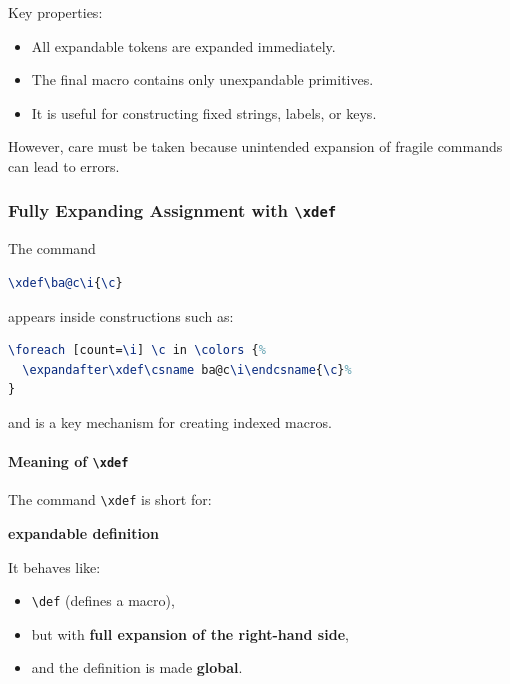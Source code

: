 Key properties:

\begin{itemize}
\item All expandable tokens are expanded immediately.
\item The final macro contains only unexpandable primitives.
\item It is useful for constructing fixed strings, labels, or keys.
\end{itemize}

However, care must be taken because unintended expansion of fragile commands can lead to errors.

\subsubsection{Fully Expanding Assignment with \texttt{\textbackslash xdef}}

The command

\begin{lstlisting}[language=LaTeX]
\xdef\ba@c\i{\c}
\end{lstlisting}

appears inside constructions such as:

\begin{lstlisting}[language=LaTeX]
\foreach [count=\i] \c in \colors {%
  \expandafter\xdef\csname ba@c\i\endcsname{\c}%
}
\end{lstlisting}

and is a key mechanism for creating indexed macros.



\paragraph{Meaning of \texttt{\textbackslash xdef}}

The command \verb|\xdef| is short for:

\begin{center}
\textbf{e\textbf{x}pandable \textbf{def}inition}
\end{center}

It behaves like:

\begin{itemize}
\item \verb|\def| (defines a macro),
\item but with \textbf{full expansion of the right-hand side},
\item and the definition is made \textbf{global}.
\end{itemize}



